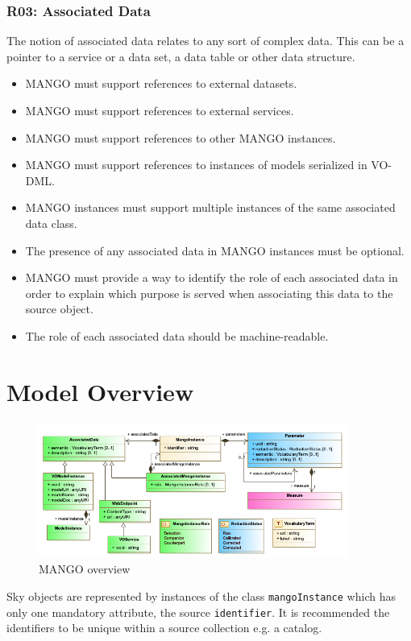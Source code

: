 \documentclass[11pt,a4paper]{ivoa}
\begin{document}
\subsubsection{R03: Associated Data}
The notion of associated data relates to any sort of complex data. This can be a pointer to a service or a data set, a data table or  other data structure.
\begin{itemize}
    \item MANGO must support references to external datasets.
    \item MANGO must support references to external services.
    \item MANGO must support references to other MANGO instances.
    \item MANGO  must support references to instances of models serialized in VO-DML.
    \item MANGO instances must support multiple instances of the same associated data class.
    \item The presence of any associated data in MANGO instances must be optional.
    \item MANGO must provide a way to identify the role of each associated data in order to explain which purpose is served when associating this data to the source object.
    \item The role of each associated data should be machine-readable.
 \end{itemize}

\section{Model Overview}

\begin{figure}
\includegraphics[width=0.9\textwidth]{../model/mangoOverview.png}
\caption{MANGO overview}
\label{fig:overview}
\end{figure}


Sky objects are represented by instances of the class \texttt{mangoInstance} which has only one mandatory attribute, the source \texttt{identifier}.
It is recommended the identifiers to be unique within a source collection e.g. a catalog.
\end{document}
